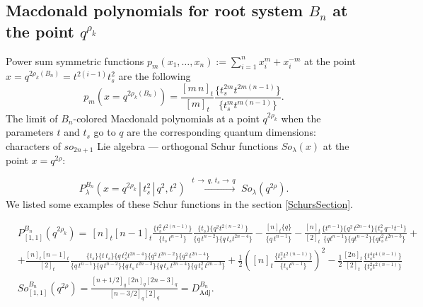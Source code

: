 \documentclass{article}
\def\nn{\nonumber}
\def\Adj{\text{Adj}}
\def\nn{\nonumber}
\begin{document}
\subsection*{Macdonald polynomials for root system $B_n$ at the point $q^{\rho_k}$}
Power sum symmetric functions $p_m (x_1,\dots, x_n) := \sum_{i=1}^n x_i^m+x_i^{-m}$ at the point $x = q^{2\rho_k(B_n)} = t^{2(i-1)}t_s^2$ are the following
\begin{equation}
    p_m \left(x = q^{2\rho_k(B_n)} \right) = \frac{[m\,n]_t}{[m]_t} \frac{\{t_s^{2m}t^{2m(n-1)}\}}{\{t_s^{m}t^{m(n-1)}\}}.
\end{equation}
The limit of $B_n$-colored Macdonald polynomials at a point $q^{2\rho_k}$ when the parameters $t$ and $t_s$ go to $q$ are the corresponding quantum dimensions: characters of $so_{2n+1}$ Lie algebra --- orthogonal Schur functions $So_{\lambda}(x)$ at the point $x = q^{2\rho}$:

\begin{equation}
   P_{\lambda}^{B_n}\left(x = q^{2\rho_k}\,|\,t_s^2\,|\,q^2,t^2\right)  \,\, \xrightarrow[]{t\,\rightarrow\, q,\, t_s \rightarrow\, q} \,\, So_{\lambda}(q^{2\rho}).
\end{equation}
We listed some examples of these Schur functions in the section 
\ref{SchursSection}.

\begin{align}
      & P_{[1,1]}^{B_n}(q^{2\rho_k})  =  \,[n]_t[n-1]_t \frac{\{t_s^{2}\,t^{2(n-1)}\}}{\{t_s \,t^{n-1}\}} \frac{ \{t_s\}  \{q^2 t^{2 (n-2)}\}}{\{q\, t^{n-2}\}\{q \,t_s t^{2 n-4}\}} - \frac{[n]_t \{q\}}{\{q\,t^{n-1}\}} - \frac{[n]_t}{[2]_t} \frac{\{t^{n-1}\}\{q^2\,t^{2n-4}\}\{t_s^2\,q^{-1}t^{-1}\}}{\{qt^{n-1}\}\{qt^{n-2}\}\{qt_s^2\,t^{2n-3}\}}+ \nn\\
     & + \frac{[n]_t[n-1]_t}{[2]_t} \frac{\{t_s\}\{t\,t_s\}\{q\,t_s^2 t^{2n-4}\}\{q^2\,t^{2n-2}\}\{q^2\,t^{2n-4}\}}{\{q\,t^{n-1}\}\{q\,t^{n-2}\}\{q\,t_s\,t^{2n-3}\}\{q\,t_s\,t^{2n-4}\}\{q\,t_s^2\,t^{2n-3}\}} +\frac{1}{2}\left([n]_t \frac{\{t_s^2 t^{2(n-1)}\}}{\{t_s t^{n-1}\}}\right)^2 -\frac{1}{2} \frac{[2n]_t}{[2]_t} \frac{\{t_s^4 t^{4(n-1)}\}}{\{t_s^2 t^{2(n-1)}\}}\\
     & So^{B_n}_{[1,1]}(q^{2\rho}) =  \frac{[n+1/2]_q [2n]_q [2n-3]_q}{[n-3/2]_q[2]_q}  =  D_{\Adj}^{B_n} .
\end{align}
\end{document}
